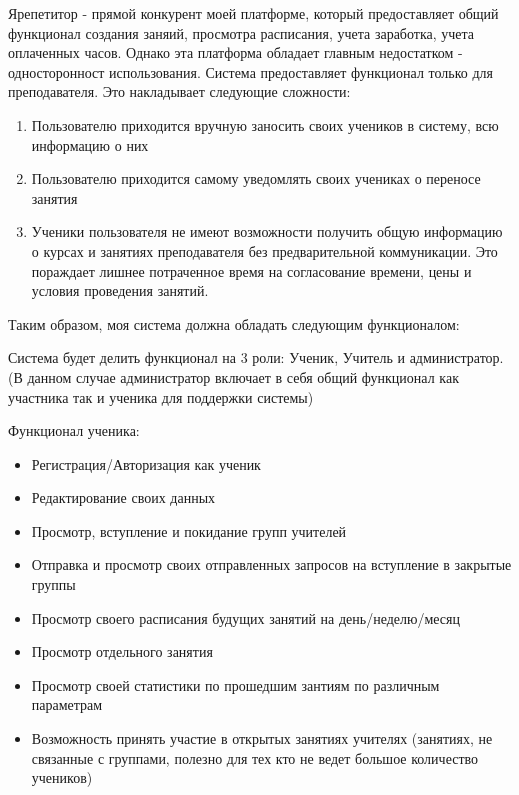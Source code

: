 \documentclass[14pt, timesnewroman]{article}
\begin{document}
Ярепетитор - прямой конкурент моей платформе, который предоставляет общий функционал создания заняий, просмотра расписания, учета заработка, учета оплаченных часов.
Однако эта платформа обладает главным недостатком - односторонност использования. Система предоставляет функционал только для преподавателя. 
Это накладывает следующие сложности:
\begin{enumerate}
    \item Пользователю приходится вручную заносить своих учеников в систему, всю информацию о них
    \item Пользователю приходится самому уведомлять своих учениках о переносе занятия
    \item Ученики пользователя не имеют возможности получить общую информацию о курсах и занятиях преподавателя без предварительной коммуникации. Это пораждает лишнее потраченное время на согласование времени, цены и условия проведения занятий. 
\end{enumerate}


Таким образом, моя система должна обладать следующим функционалом:

Система будет делить функционал на 3 роли: Ученик, Учитель и администратор. (В данном случае администратор включает в себя общий функционал как участника так и ученика для поддержки системы)

Функционал ученика:
\begin{itemize}
    \item Регистрация/Авторизация как ученик
    \item Редактирование своих данных
    \item Просмотр, вступление и покидание групп учителей
    \item Отправка и просмотр своих отправленных запросов на вступление в закрытые группы
    \item Просмотр своего расписания будущих занятий на день/неделю/месяц
    \item Просмотр отдельного занятия
    \item Просмотр своей статистики по прошедшим зантиям по различным параметрам
    \item Возможность принять участие в открытых занятиях учителях (занятиях, не связанные с группами, полезно для тех кто не ведет большое количество учеников)
\end{itemize}
\end{document}

